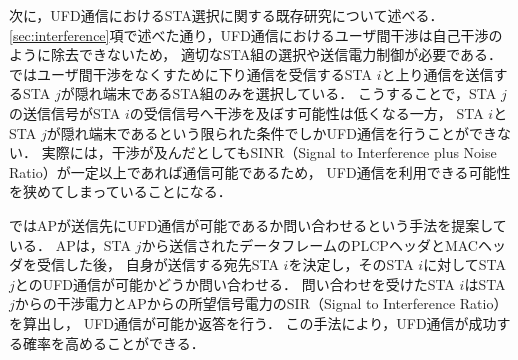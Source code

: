 \documentclass[master]{kuisthesis}		%
\begin{document}
			\par
			次に，UFD通信におけるSTA選択に関する既存研究について述べる．
			\ref{sec:interference}項で述べた通り，UFD通信におけるユーザ間干渉は自己干渉のように除去できないため，
			適切なSTA組の選択や送信電力制御が必要である．
			\cite{fdmac3}ではユーザ間干渉をなくすために下り通信を受信するSTA $i$と上り通信を送信するSTA $j$が隠れ端末であるSTA組のみを選択している．
			こうすることで，STA $j$の送信信号がSTA $i$の受信信号へ干渉を及ぼす可能性は低くなる一方，
			STA $i$とSTA $j$が隠れ端末であるという限られた条件でしかUFD通信を行うことができない．
			実際には，干渉が及んだとしてもSINR（Signal to Interference plus Noise Ratio）が一定以上であれば通信可能であるため，
			UFD通信を利用できる可能性を狭めてしまっていることになる．
			\par
			\cite{goyal}ではAPが送信先にUFD通信が可能であるか問い合わせるという手法を提案している．
			APは，STA $j$から送信されたデータフレームのPLCPヘッダとMACヘッダを受信した後，
			自身が送信する宛先STA $i$を決定し，そのSTA $i$に対してSTA $j$とのUFD通信が可能かどうか問い合わせる．
			問い合わせを受けたSTA $i$はSTA $j$からの干渉電力とAPからの所望信号電力のSIR（Signal to Interference Ratio）を算出し，
			UFD通信が可能か返答を行う．
			この手法により，UFD通信が成功する確率を高めることができる．
\end{document}
